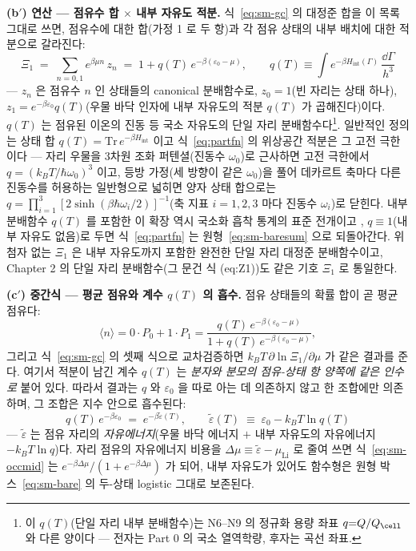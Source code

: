 \textbf{(b$'$) 연산 --- 점유수 합 $\times$ 내부 자유도 적분.} 식~\eqref{eq:sm-gc} 의 대정준 합을 이 목록
그대로 쓰면, 점유수에 대한 합(가정 1 로 두 항)과 각 점유 상태의 내부 배치에 대한 적분으로 갈라진다:
\begin{equation}
\Xi_1\;=\;\sum_{n=0,1}e^{\beta\mu n}\,z_n
\;=\;1+q(T)\,e^{-\beta(\varepsilon_0-\mu)},
\qquad
q(T)\equiv\int e^{-\beta H_\mathrm{int}(\Gamma)}\,\frac{\dd\Gamma}{h^3}
\label{eq:partfn}
\end{equation}
--- $z_n$ 은 점유수 $n$ 인 상태들의 canonical 분배함수로, $z_0=1$(빈 자리는 상태 하나),
$z_1=e^{-\beta\varepsilon_0}q(T)$(우물 바닥 인자에 내부 자유도의 적분 $q(T)$ 가 곱해진다)이다.
$q(T)$ 는 점유된 이온의 진동 등 국소 자유도의 단일 자리 분배함수다\footnote{이 $q(T)$(단일 자리 내부 분배함수)는 N6--N9 의 정규화 용량 좌표 $q{=}Q/Q_\cell$ 와 다른 양이다 --- 전자는 Part 0 의 국소 열역학량, 후자는 곡선 좌표.}. 일반적인 정의는 상태
합 $q(T)=\mathrm{Tr}\,e^{-\beta H_\mathrm{int}}$ 이고 식~\eqref{eq:partfn} 의 위상공간 적분은 그 고전
극한이다 --- 자리 우물을 3차원 조화 퍼텐셜(진동수 $\omega_0$)로 근사하면 고전 극한에서
$q=(k_BT/\hbar\omega_0)^3$ 이고, 등방 가정(세 방향이 같은 $\omega_0$)을 풀어 데카르트 축마다 다른
진동수를 허용하는 일반형으로 넓히면 양자 상태 합으로는
$q=\prod_{i=1}^{3}[2\sinh(\beta\hbar\omega_i/2)]^{-1}$(축 지표 $i=1,2,3$ 마다 진동수 $\omega_i$)로 닫힌다.
내부 분배함수 $q(T)$ 를 포함한 이 확장 역시 국소화 흡착 통계의 표준 전개이고
\cite{hill1960,fowler1939,mcquarrie1976}, $q\equiv1$(내부 자유도 없음)로 두면
식~\eqref{eq:partfn} 는 원형~\eqref{eq:sm-baresum} 으로 되돌아간다. 위 첨자 없는 $\Xi_1$ 은 내부
자유도까지 포함한 완전한 단일 자리 대정준 분배함수이고, Chapter 2 의 단일 자리 분배함수(그 문건 식
(eq:Z1))도 같은 기호 $\Xi_1$ 로 통일한다.

\textbf{(c$'$) 중간식 --- 평균 점유와 계수 $q(T)$ 의 흡수.} 점유 상태들의 확률 합이 곧 평균 점유다:
\begin{equation}
\langle n\rangle=0\cdot P_0+1\cdot P_1
=\frac{q(T)\,e^{-\beta(\varepsilon_0-\mu)}}{1+q(T)\,e^{-\beta(\varepsilon_0-\mu)}},
\label{eq:sm-occmid}
\end{equation}
그리고 식~\eqref{eq:sm-gc} 의 셋째 식으로 교차검증하면 $k_BT\,\partial\ln\Xi_1/\partial\mu$ 가 같은
결과를 준다. 여기서 적분이 남긴 계수 $q(T)$ 는 \emph{분자와 분모의 점유-상태 항 양쪽에 같은 인수로}
붙어 있다. 따라서 결과는 $q$ 와 $\varepsilon_0$ 을 따로 아는 데 의존하지 않고 한 조합에만 의존하며,
그 조합은 지수 안으로 흡수된다:
\begin{equation}
q(T)\,e^{-\beta\varepsilon_0}\;=\;e^{-\beta\tilde\varepsilon(T)},
\qquad
\tilde\varepsilon(T)\;\equiv\;\varepsilon_0-k_BT\ln q(T)
\label{eq:sm-epstilde}
\end{equation}
--- $\tilde\varepsilon$ 는 점유 자리의 \emph{자유에너지}(우물 바닥 에너지 $+$ 내부 자유도의 자유에너지
$-k_BT\ln q$)다. 자리 점유의 자유에너지 비용을 $\Delta\mu\equiv\tilde\varepsilon-\mu_\mathrm{Li}$ 로
줄여 쓰면 식~\eqref{eq:sm-occmid} 는 $e^{-\beta\Delta\mu}/(1+e^{-\beta\Delta\mu})$ 가 되어, 내부
자유도가 있어도 함수형은 원형 박스~\eqref{eq:sm-bare} 의 두-상태 logistic 그대로 보존된다.

